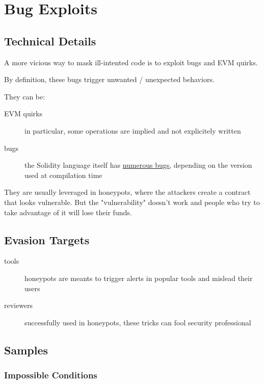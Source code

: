 \section{Bug Exploits}

\subsection{Technical Details}

A more vicious way to mask ill-intented code is to exploit bugs and EVM quirks.

By definition, these bugs trigger unwanted / unexpected behaviors.

They can be:

\begin{description}
\item[EVM quirks]{in particular, some operations are implied and not explicitely written}
\item[bugs]{the Solidity language itself has \href{https://github.com/ethereum/solidity/blob/develop/docs/bugs.json}{numerous bugs}, depending on the version used at compilation time \cite{changelog-solidity-bugs}}
\end{description}

They are usually leveraged in honeypots, where the attackers create a contract that looks vulnerable.
But the "vulnerability" doesn't work and people who try to take advantage of it will lose their funds.

\subsection{Evasion Targets}

\begin{description}
\item[tools]{honeypots are meants to trigger alerts in popular tools and mislead their users}
\item[reviewers]{successfully used in honeypots, these tricks can fool security professional}
\end{description}

\subsection{Samples}

\subsubsection{Impossible Conditions}

